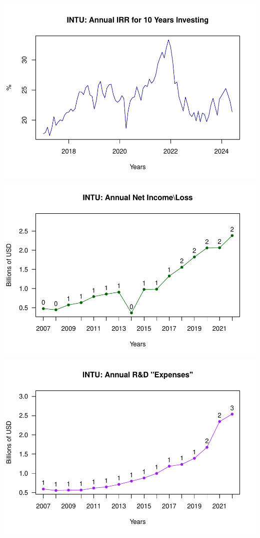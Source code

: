 \documentclass[
]{book}
\begin{document}
\includegraphics{_main_files/figure-latex/unnamed-chunk-1-26.pdf}
\includegraphics{_main_files/figure-latex/unnamed-chunk-1-27.pdf}
\includegraphics{_main_files/figure-latex/unnamed-chunk-1-28.pdf}
\end{document}

